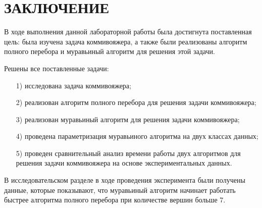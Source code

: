 {\centering \chapter*{ЗАКЛЮЧЕНИЕ}}

В ходе выполнения данной лабораторной работы была достигнута поставленная цель: была изучена задача коммивояжера, а также были реализованы алгоритм полного перебора и муравьиный алгоритм для решения этой задачи.

Решены все поставленные задачи:
\begin{enumerate}
\item[1)] исследована задача коммивояжера;
\item[2)] реализован алгоритм полного перебора для решения задачи коммивояжера;
\item[3)] реализован муравьиный алгоритм для решения задачи коммивояжера;
\item[4)] проведена параметризация муравьиного алгоритма на двух классах данных;
\item[5)] проведен сравнительный анализ времени работы двух алгоритмов для решения задачи коммивояжера на основе экспериментальных данных.
\end{enumerate}

В исследовательском разделе в ходе проведения эксперимента были получены данные, которые показывают, что муравьиный алгоритм начинает работать быстрее алгоритма полного перебора при количестве вершин больше 7.
